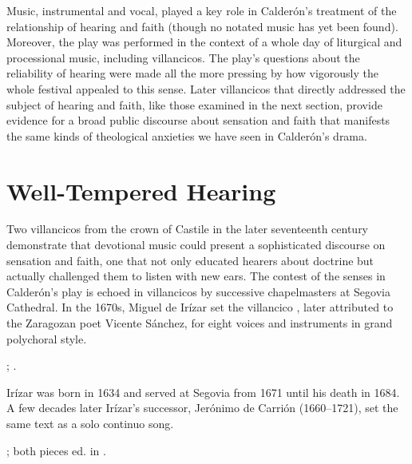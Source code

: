 
Music, instrumental and vocal, played a key role in Calderón's treatment of the
relationship of hearing and faith (though no notated music has yet been found).
Moreover, the play was performed in the context of a whole day of liturgical
and processional music, including villancicos.
The play's questions about the reliability of hearing were made all the more
pressing by how vigorously the whole festival appealed to this sense.
Later villancicos that directly addressed the subject of hearing and faith,
like those examined in the next section, provide evidence for a broad public
discourse about sensation and faith that manifests the same kinds of
theological anxieties we have seen in Calderón's drama.


\section{Well-Tempered Hearing}

Two villancicos from the crown of Castile in the later seventeenth century
demonstrate that devotional music could present a sophisticated discourse on
sensation and faith, one that not only educated hearers about doctrine but
actually challenged them to listen with new ears.  
The contest of the senses in Calderón's play is echoed in villancicos by
successive chapelmasters at Segovia Cathedral.
In the 1670s, Miguel de Irízar set the villancico , later attributed to the Zaragozan poet Vicente Sánchez,
for eight voices and instruments in grand polychoral style.%
\begin{Footnote}
   ; \autocite{LopezCalo:Segovia}.
\end{Footnote}
Irízar was born in 1634 and served at Segovia from 1671 until his death in 1684.
A few decades later Irízar's successor, Jerónimo de Carrión (1660--1721), set
the same text as a solo continuo song.%
\begin{Footnote}
    ; both pieces ed. in \autocite[133--152]{Cashner:WLSCM32}.
\end{Footnote}


